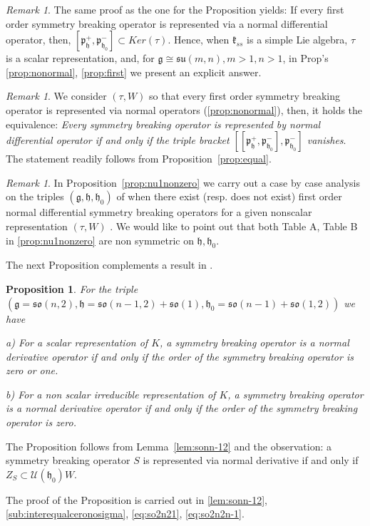 \documentclass[12pt]{amsart}
\newtheorem{prop}[thm]{Proposition}
\theoremstyle{definition}
\theoremstyle{remark}
\newtheorem{rmk}[thm]{Remark}
\newcommand{\g}{\mathfrak{g}}
\newcommand{\h}{\mathfrak{h}}
\renewcommand{\k}{{\mathfrak k}}
\newcommand{\p}{\mathfrak p}
\numberwithin{equation}{section}
\begin{document}
\begin{rmk} The same proof as the one for the Proposition yields: If every first order symmetry breaking operator is represented via a normal differential operator, then,
 $[\p_\h^+, \p_{\h_0}^-] \subset Ker(\tau)$. Hence, when $\k_{ss}$ is a simple Lie algebra,  $\tau$ is a scalar representation, and, for    $\g\cong \mathfrak{su}(m,n), m>1,n>1 $, in Prop's \ref{prop:nonormal}, \ref{prop:first}   we present an explicit answer.\\
\end{rmk}
\begin{rmk}We consider $(\tau, W)$ so that every first order symmetry breaking operator is represented via normal operators (\ref{prop:nonormal}), then, it holds the equivalence: {\it Every symmetry breaking operator is represented by normal differential operator if and only if the triple bracket $[[\p_\h^+, \p_{\h_0}^-], \p_{\h_0}^-] $ vanishes}. The statement readily  follows from Proposition~\ref{prop:equal}.
\end{rmk}
\begin{rmk} In Proposition~\ref{prop:nu1nonzero} we carry out a case by case  analysis on the triples $(\g,\h,\h_0)$ of when there exist (resp. does not exist) first order normal differential symmetry breaking operators for a given   nonscalar representation $(\tau,W)$ . We would like to point out that both Table A,  Table B in \ref{prop:nu1nonzero} are non symmetric on   $\h, \h_0 $.
\end{rmk}
The next Proposition complements a result in  \cite[Theorem 5.3]{KP2}.
\begin{prop}\label{prop:sonn-1}For the triple $(\g=\mathfrak{so}(n,2), \h=\mathfrak{so}(n-1,2)+\mathfrak{so}(1), \h_0=\mathfrak{so}(n-1)+\mathfrak{so}(1,2))$ we have

a) For a scalar representation of $K$, a  symmetry breaking operator is a normal derivative operator if and only if the order of the symmetry breaking operator is zero or one.

b)  For a non scalar irreducible representation of $K$, a  symmetry breaking operator is a normal derivative operator if and only if the order of the symmetry breaking operator is zero.
\end{prop} The Proposition follows from Lemma~\ref{lem:sonn-12} and the observation:  a symmetry breaking operator $S$ is represented via normal derivative if and only if  $Z_S \subset \mathcal U(\h_0)W$.

The proof of the Proposition is carried out in \ref{lem:sonn-12}, \ref{sub:interequalceronosigma}, \ref{eq:so2n21}, \ref{eq:so2n2n-1}.
\end{document}
